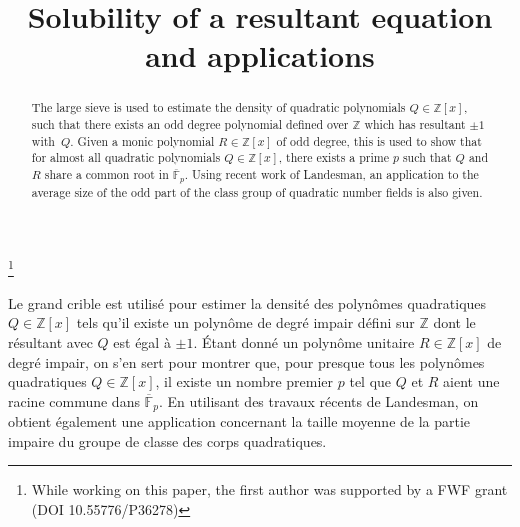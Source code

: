 \documentclass[JEP,XML,SOM,Unicode]{cedram}
\begin{document}
\frontmatter
\title{Solubility of a resultant equation and applications}

\author[\initial{T.} \lastname{Browning}]{ }
\address{ISTA,\\
Am Campus 1, 3400 Klosterneuburg, Austria}

\author[\initial{S.} \lastname{Chan}]{ }
\address{Department of Mathematics, University College London,\\
Gower Street, London WC1E 6BT, UK}

\thanks{While working on this paper, the first author was supported by a FWF grant (DOI 10.55776/P36278)}

\begin{abstract}
The large sieve is used to estimate the density of quadratic polynomials $Q\in\mathbb{Z}[x]$, such that there exists an odd degree polynomial defined over $\mathbb{Z}$ which has resultant $\pm 1$ with~$Q$. Given a monic polynomial $R\in\mathbb{Z}[x]$ of odd degree, this is used to show that for almost all quadratic polynomials $Q\in\mathbb{Z}[x]$, there exists a prime $p$ such that $Q$ and $R$ share a common root in $\overline{\mathbb{F}}_p$. Using recent work of Landesman, an application to the average size of the odd part of the class group of quadratic number fields is also given.
\end{abstract}





\begin{altabstract}
Le grand crible est utilisé pour estimer la densité des polynômes quadratiques $Q \in \mathbb{Z}[x]$ tels qu’il existe un polynôme de degré impair défini sur $\mathbb{Z}$ dont le résultant avec $Q$ est égal à $\pm 1$. Étant donné un polynôme unitaire $R \in \mathbb{Z}[x]$ de degré impair, on s’en sert pour montrer que, pour presque tous les polynômes quadratiques $Q \in \mathbb{Z}[x]$, il existe un nombre premier $p$ tel que $Q$ et $R$ aient une racine commune dans $\overline{\mathbb{F}}_p$. En utilisant des travaux récents de Landesman, on obtient également une application concernant la taille moyenne de la partie impaire du groupe de classe des corps quadratiques.
\end{altabstract}
\end{document}
